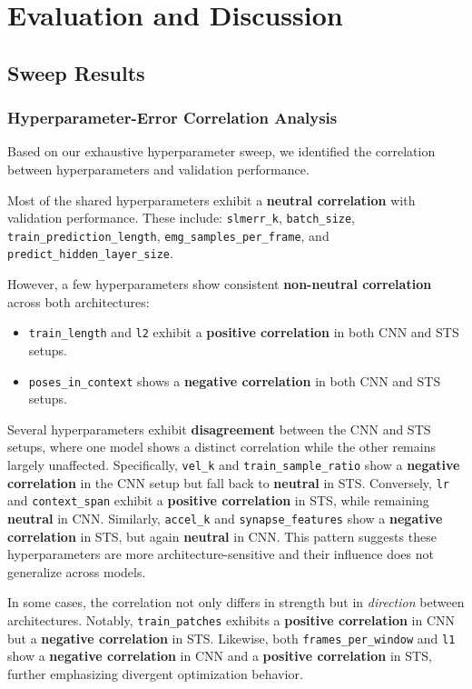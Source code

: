 \chapter{Evaluation and Discussion}
\label{chap:eval}

\section{Sweep Results}

\subsection{Hyperparameter-Error Correlation Analysis}
Based on our exhaustive hyperparameter sweep, we identified the correlation between hyperparameters and validation performance.

Most of the shared hyperparameters exhibit a \textbf{neutral correlation} with validation performance. These include: 
\texttt{slmerr\_k}, \texttt{batch\_size}, \texttt{train\_prediction\_length}, \texttt{emg\_samples\_per\_frame}, and \texttt{predict\_hidden\_layer\_size}.

However, a few hyperparameters show consistent \textbf{non-neutral correlation} across both architectures:
\begin{itemize}
    \item \texttt{train\_length} and \texttt{l2} exhibit a \textbf{positive correlation} in both CNN and STS setups.
    \item \texttt{poses\_in\_context} shows a \textbf{negative correlation} in both CNN and STS setups.
\end{itemize}

Several hyperparameters exhibit \textbf{disagreement} between the CNN and STS setups, where one model shows a distinct correlation while the other remains largely unaffected. Specifically, 
\texttt{vel\_k} and \texttt{train\_sample\_ratio} show a \textbf{negative correlation} in the CNN setup but fall back to \textbf{neutral} in STS. 
Conversely, \texttt{lr} and \texttt{context\_span} exhibit a \textbf{positive correlation} in STS, while remaining \textbf{neutral} in CNN. 
Similarly, \texttt{accel\_k} and \texttt{synapse\_features} show a \textbf{negative correlation} in STS, but again \textbf{neutral} in CNN. 
This pattern suggests these hyperparameters are more architecture-sensitive and their influence does not generalize across models.

In some cases, the correlation not only differs in strength but in \textit{direction} between architectures. 
Notably, \texttt{train\_patches} exhibits a \textbf{positive correlation} in CNN but a \textbf{negative correlation} in STS. 
Likewise, both \texttt{frames\_per\_window} and \texttt{l1} show a \textbf{negative correlation} in CNN and a \textbf{positive correlation} in STS, further emphasizing divergent optimization behavior.

